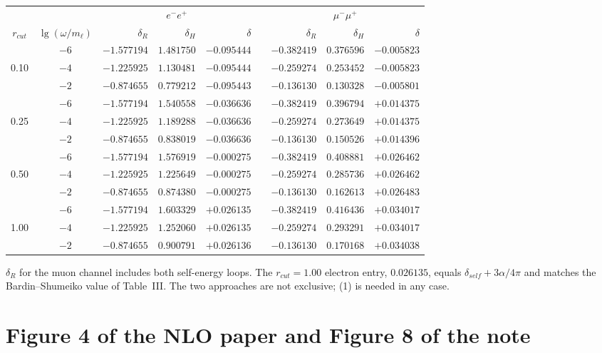 \documentclass[11pt]{article}
\begin{document}
\begin{center}
\begin{tabular}{cc rrr c rrr}
\toprule
& & \multicolumn{3}{c}{$e^-e^+$} & & \multicolumn{3}{c}{$\mu^-\mu^+$}\\
\cmidrule(lr){3-5}\cmidrule(lr){7-9}
$r_{cut}$ & $\lg(\omega/m_\ell)$ & $\delta_R$ & $\delta_H$ & $\delta$ & &
$\delta_R$ & $\delta_H$ & $\delta$\\
\midrule
      & $-6$ & $-1.577194$ & $1.481750$ & $-0.095444$ & & $-0.382419$ & $0.376596$ & $-0.005823$\\
0.10  & $-4$ & $-1.225925$ & $1.130481$ & $-0.095444$ & & $-0.259274$ & $0.253452$ & $-0.005823$\\
      & $-2$ & $-0.874655$ & $0.779212$ & $-0.095443$ & & $-0.136130$ & $0.130328$ & $-0.005801$\\
\midrule
      & $-6$ & $-1.577194$ & $1.540558$ & $-0.036636$ & & $-0.382419$ & $0.396794$ & $+0.014375$\\
0.25  & $-4$ & $-1.225925$ & $1.189288$ & $-0.036636$ & & $-0.259274$ & $0.273649$ & $+0.014375$\\
      & $-2$ & $-0.874655$ & $0.838019$ & $-0.036636$ & & $-0.136130$ & $0.150526$ & $+0.014396$\\
\midrule
      & $-6$ & $-1.577194$ & $1.576919$ & $-0.000275$ & & $-0.382419$ & $0.408881$ & $+0.026462$\\
0.50  & $-4$ & $-1.225925$ & $1.225649$ & $-0.000275$ & & $-0.259274$ & $0.285736$ & $+0.026462$\\
      & $-2$ & $-0.874655$ & $0.874380$ & $-0.000275$ & & $-0.136130$ & $0.162613$ & $+0.026483$\\
\midrule
      & $-6$ & $-1.577194$ & $1.603329$ & $+0.026135$ & & $-0.382419$ & $0.416436$ & $+0.034017$\\
1.00  & $-4$ & $-1.225925$ & $1.252060$ & $+0.026135$ & & $-0.259274$ & $0.293291$ & $+0.034017$\\
      & $-2$ & $-0.874655$ & $0.900791$ & $+0.026136$ & & $-0.136130$ & $0.170168$ & $+0.034038$\\
\bottomrule
\end{tabular}
\end{center}
$\delta_R$ for the muon channel includes both self-energy loops. The
$r_{cut}=1.00$ electron entry, $0.026135$, equals
$\delta_{self}+3\alpha/4\pi$ and matches the Bardin--Shumeiko value of Table~III.
The two approaches are not exclusive; (1) is needed in any case.

\section{Figure 4 of the NLO paper and Figure 8 of the note}
\end{document}
